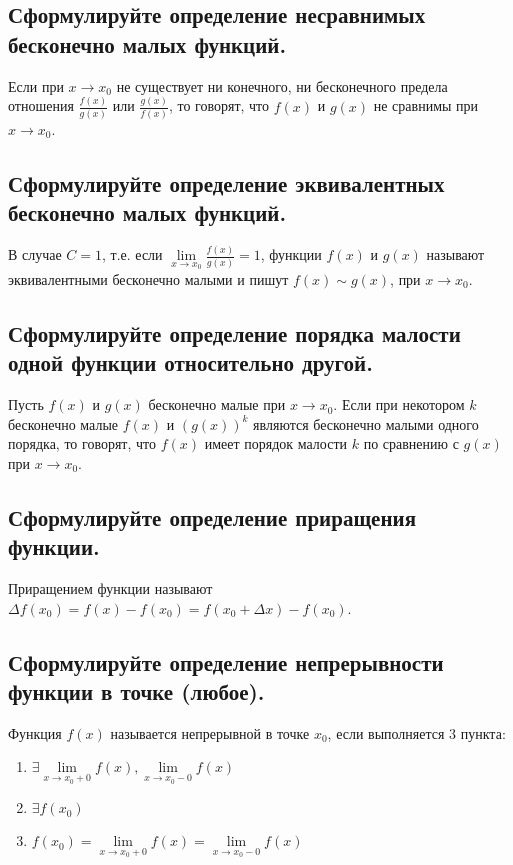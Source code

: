     \subsection{Сформулируйте определение несравнимых бесконечно малых функций.}

    Если при $x \to x_0$ не существует ни конечного, ни бесконечного предела 
    отношения $\frac{f(x)}{g(x)}$ или $\frac{g(x)}{f(x)}$, то говорят, что $f(x)$ и $g(x)$ не сравнимы при $x \to x_0$.

    \subsection{Сформулируйте определение эквивалентных бесконечно малых функций.}
    
    В случае $C = 1$, т.е. если $\lim\limits_{x \to x_0}\frac{f(x)}{g(x)} = 1$, 
    функции $f(x)$ и $g(x)$ называют эквивалентными бесконечно малыми и пишут $f(x) \sim g(x)$, при $x \to x_0$.

    \subsection{Сформулируйте определение порядка малости одной функции относительно другой.}

    Пусть $f(x)$ и $g(x)$ бесконечно малые при $x \to x_0$. Если при некотором $k$
    бесконечно малые $f(x)$ и $(g(x))^k$ являются бесконечно малыми одного порядка,
    то говорят, что $f(x)$ имеет порядок малости $k$ по сравнению с $g(x)$ при $x \to x_0$.

    \subsection{Сформулируйте определение приращения функции.}

    Приращением функции называют $\Delta f(x_0) = f(x) - f(x_0) = f(x_0 + \Delta x) - f(x_0)$.

    \subsection{Сформулируйте определение непрерывности функции в точке (любое).}

    Функция $f(x)$ называется непрерывной в точке $x_0$, если выполняется 3 пункта:
    \begin{enumerate}
        \item $\exists\lim\limits_{x \to x_0 + 0}f(x),\lim\limits_{x \to x_0 - 0}f(x)$
        \item $\exists f(x_0)$
        \item $f(x_0) = \lim\limits_{x \to x_0 + 0}f(x) = \lim\limits_{x \to x_0 - 0}f(x)$
    \end{enumerate} 

